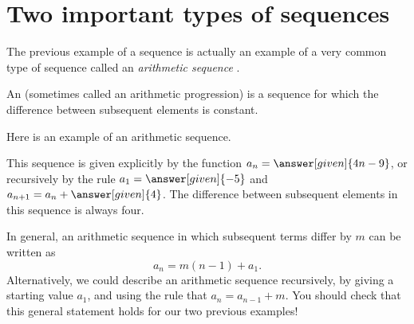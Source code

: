 \documentclass{ximera}
\begin{document}
\section{Two important types of sequences}

The previous example of a sequence is actually an example of a very common type of sequence called an \emph{arithmetic sequence} .  

\begin{definition}
  An  (sometimes called an arithmetic
  progression) is a sequence for which the
  difference between subsequent elements is constant.
\end{definition}


\begin{example}
  Here is an example of an arithmetic sequence.
  \begin{image}
  \end{image}
  This sequence is given explicitly by the function $a_n=\answer[given]{4n-9}$,
  or recursively by the rule $a_1 = \answer[given]{-5}$ and $a_{n+1} = a_n
  + \answer[given]{4}$. The difference between subsequent elements in this sequence is always four.
\end{example}

In general, an arithmetic sequence in which subsequent terms differ
by $m$ can be written as
\[
a_n = m (n-1) + a_1.
\]
Alternatively, we could describe an arithmetic sequence recursively,
by giving a starting value $a_1$, and using the rule that $a_{n} =
a_{n-1} + m$.  You should check that this general statement holds for our 
two previous examples!
\end{document}

